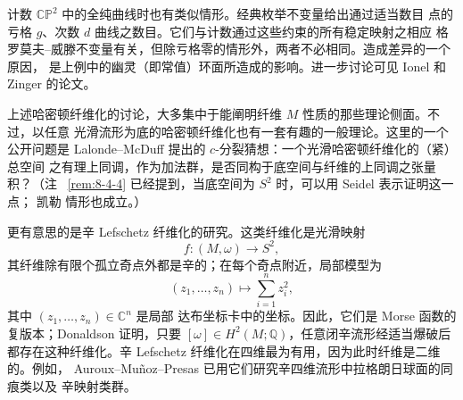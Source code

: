 \begin{example}
计数 $\mathbb{CP}^2$ 中的全纯曲线时也有类似情形。经典枚举不变量给出通过适当数目
点的亏格 $g$、次数 $d$ 曲线之数目。它们与计数通过这些约束的所有稳定映射之相应
格罗莫夫--威滕不变量有关，但除亏格零的情形外，两者不必相同。造成差异的一个原因，
是上例中的幽灵（即常值）环面所造成的影响。进一步讨论可见 Ionel  和
Zinger  的论文。
\end{example}

\begin{remark}\label{rem:8-6-13}
上述哈密顿纤维化的讨论，大多集中于能阐明纤维 $M$ 性质的那些理论侧面。不过，以任意
光滑流形为底的哈密顿纤维化也有一套有趣的一般理论。这里的一个公开问题是
Lalonde--McDuff  提出的 $c$-分裂猜想：一个光滑哈密顿纤维化的（紧）总空间
之有理上同调，作为加法群，是否同构于底空间与纤维的上同调之张量积？（注
~\ref{rem:8-4-4} 已经提到，当底空间为 $S^2$ 时，可以用 Seidel 表示证明这一点；
凯勒 情形也成立。）

更有意思的是辛 Lefschetz 纤维化的研究。这类纤维化是光滑映射
\[
  f:(M,\omega)\longrightarrow S^2,
\]
其纤维除有限个孤立奇点外都是辛的；在每个奇点附近，局部模型为
\[
  (z_1,\ldots,z_n)\longmapsto\sum_{i=1}^n z_i^2,
\]
其中 $(z_1,\ldots,z_n)\in\mathbb C^n$ 是局部 达布坐标卡中的坐标。因此，它们是
Morse 函数的复版本；Donaldson  证明，只要
$[\omega]\in H^2(M;\mathbb Q)$，任意闭辛流形经适当爆破后都存在这种纤维化。辛
Lefschetz 纤维化在四维最为有用，因为此时纤维是二维的。例如，
Auroux--Muñoz--Presas  已用它们研究辛四维流形中拉格朗日球面的同痕类以及
辛映射类群。
\end{remark}
